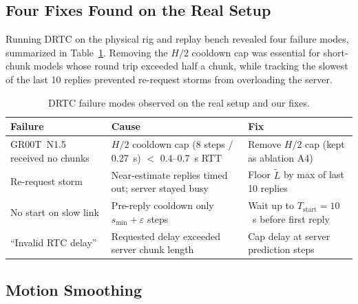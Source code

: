 \documentclass[conference]{IEEEtran}
\newcommand{\drtc}{DRTC}
\newcommand{\groot}{GR00T~N1.5}
\begin{document}
\subsection{Four Fixes Found on the Real Setup}

Running \drtc{} on the physical rig and replay bench revealed four failure modes, summarized in Table~\ref{tab:fixes}. Removing the $H/2$ cooldown cap was essential for short-chunk models whose round trip exceeded half a chunk, while tracking the slowest of the last 10 replies prevented re-request storms from overloading the server.

\begin{table}[t]
  \centering
  \caption{DRTC failure modes observed on the real setup and our fixes.}
  \label{tab:fixes}
  \footnotesize
  \begin{tabular}{@{}p{}p{}p{}@{}}
    \toprule
    Failure & Cause & Fix \\
    \midrule
    \groot{} received no chunks & $H/2$ cooldown cap (8 steps / 0.27~s) $<$ 0.4--0.7~s RTT & Remove $H/2$ cap (kept as ablation A4) \\
    Re-request storm & Near-estimate replies timed out; server stayed busy & Floor $\tilde{L}$ by max of last 10 replies \\
    No start on slow link & Pre-reply cooldown only $s_{\min}+\varepsilon$ steps & Wait up to $T_{\mathrm{start}}=10$~s before first reply \\
    ``Invalid RTC delay'' & Requested delay exceeded server chunk length & Cap delay at server prediction steps \\
    \bottomrule
  \end{tabular}
\end{table}

\subsection{Motion Smoothing}
\end{document}
